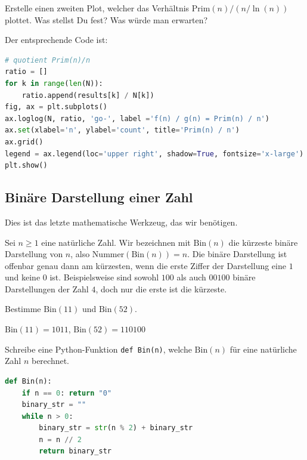\begin{myexercise}
	Erstelle einen zweiten Plot, welcher das Verhältnis $\text{Prim}(n) / (n / \ln{(n)})$ plottet. Was stellst Du fest? Was würde man erwarten?
	\begin{myanswer}
		Der entsprechende Code ist:
		\begin{lstlisting}[language=Python,numbers=none]
# quotient Prim(n)/n
ratio = []
for k in range(len(N)):
    ratio.append(results[k] / N[k])
fig, ax = plt.subplots()
ax.loglog(N, ratio, 'go-', label ='f(n) / g(n) = Prim(n) / n')
ax.set(xlabel='n', ylabel='count', title='Prim(n) / n')
ax.grid()
legend = ax.legend(loc='upper right', shadow=True, fontsize='x-large')
plt.show()
\end{lstlisting}
	\end{myanswer}
\end{myexercise}

\clearpage

\subsection{Binäre Darstellung einer Zahl}
Dies ist das letzte mathematische Werkzeug, das wir benötigen.

Sei $n\geq 1$ eine natürliche Zahl. Wir bezeichnen mit $\text{Bin}(n)$ die kürzeste binäre Darstellung von $n$, also $\text{Nummer}(\text{Bin}(n)) = n$.
Die binäre Darstellung ist offenbar genau dann am kürzesten, wenn die erste Ziffer der Darstellung eine $1$ und keine $0$ ist.
Beispielsweise sind sowohl $100$ als auch $00100$ binäre Darstellungen der Zahl $4$, doch nur die erste ist die kürzeste.

\begin{myexercise}
	Bestimme $\text{Bin}(11)$ und $\text{Bin}(52)$.
	\begin{myanswer}
		$\text{Bin}(11) = 1011$, $\text{Bin}(52) = 110100$
	\end{myanswer}
\end{myexercise}

\begin{mychallenge}
	Schreibe eine Python-Funktion \lstinline|def Bin(n)|, welche $\text{Bin}(n)$ für eine natürliche Zahl $n$ berechnet.
	\begin{myanswer}
		\begin{lstlisting}[language=Python,numbers=none]
def Bin(n):
    if n == 0: return "0"
    binary_str = ""
    while n > 0:
        binary_str = str(n % 2) + binary_str
        n = n // 2
        return binary_str
\end{lstlisting}
	\end{myanswer}
\end{mychallenge}

